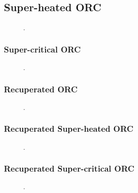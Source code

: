 \subsection{Super-heated ORC}
    \label{sec:ORCvsDSC_superheated}

    \begin{figure}[H]
        \centering
        
        \caption{.}
        \label{fig:prosim_purewater_suph_ORC_Wnet}
    \end{figure}



\subsubsection{Super-critical ORC}
    \label{sec:ORCvsDSC_supercritical}

    \begin{figure}[H]
        \centering
        
        \caption{.}
        \label{fig:prosim_purewater_supcrit_ORC_Wnet}
    \end{figure}

\subsubsection{Recuperated ORC}

    \begin{figure}[H]
        \centering
        
        \caption{.}
        \label{fig:prosim_purewater_recup_ORC_Wnet}
    \end{figure}

\subsubsection{Recuperated Super-heated ORC}

    \begin{figure}[H]
        \centering
        
        \caption{.}
        \label{fig:prosim_purewater_suphrecup_ORC_Wnet}
    \end{figure}

\subsubsection{Recuperated Super-critical ORC}

    \begin{figure}[H]
        \centering
        
        \caption{.}
        \label{fig:prosim_purewater_supcritrecup_ORC_Wnet}
    \end{figure}


\clearpage
